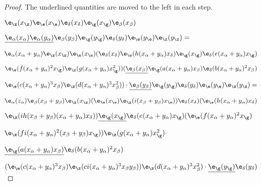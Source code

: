 \documentclass{memo-l}
\theoremstyle{definition}
\theoremstyle{remark}
\numberwithin{section}{chapter}
\numberwithin{equation}{chapter}
\begin{document}
\begin{proof}    The underlined quantities are moved to the left in each step.

${\e}_{{\z}}(x_{{\z}}){\e}_{{\e}}(x_{{\e}})
{\e}_{{\delta}}(x_{{\delta}}){\e}_{{\g}}(x_{{\g}})
{\e}_{\beta}(x_{\beta})$

$
{\underline{{\e}_{\alpha}(x_{\alpha}){\e}_{\alpha}(y_{\alpha})}}
{\e}_{\beta}(y_{\beta})
{\e}_{{\g}}(y_{{\g}}){\e}_{{\delta}}(y_{{\delta}})
{\e}_{{\e}}(y_{{\e}}){\e}_{{\z}}(y_{{\z}})=$

\medpagebreak

${\e}_{\alpha}({ {x_{\alpha}+y_{\alpha}}}){\e}_{{\z}}
(x_{{\z}}){\e}_{{\e}}(x_{{\e}})
{ (}{\e}_{{\delta}}(x_{{\delta}}){\e}_{{\e}}
(h(x_{\alpha}+y_{\alpha})x_{{\delta}}){\e}_{{\g}}
(x_{{\g}}){\e}_{{\delta}}(e(x_{\alpha}+y_{\alpha})x_\g)$

${\e}_{{\e}}(f(x_{\alpha}+y_{\alpha})^{2}x_{{\g}})
{\e}_{{\z}}(g(x_{\alpha}+y_{\alpha})x_{{\g}}^{2}))
({\underline{{\e}_{\beta}(x_{\beta})}}
{\e}_{{\g}}(a(x_{\alpha}
+y_{\alpha})x_{\beta}){\e}_{{\delta}}(b(x_{\alpha}+
y_{\alpha})^{2}x_{\beta})$

${\e}_{{\e}}(c(x_{\alpha}+y_{\alpha})^{3}x_{\beta})
{\e}_{{\z}}(d(x_{\alpha}+y_{\alpha})^{3}x_{\beta}^{2}))\cdot
{\underline{{\e}_{\beta}(y_{\beta})}} {\e}_{{\g}}
(y_{{\g}}){\e}_{{\delta}}(y_{{\delta}}){\e}_{{\e}}
(y_{{\e}}){\e}_{{\z}}(y_{{\z}}) =$

\medpagebreak

${\e}_{\alpha}(z_{\alpha}){\e}_{\beta}({ x_{\beta}+
y_{\beta}}){\e}_{{\z}}(x_{{\z}}){ (}{\e}_{{\e}}
(x_{{\e}}){\e}_{{\z}}(i(x_{\beta}+y_{\beta})x_{{\e}})
{ )}{\e}_{{\delta}}(x_{{\delta}}){ (}{\e}_{{\e}}
(h(x_{\alpha}+y_{\alpha})x_\delta)$

$\e_\z(ih(x_\beta+y_\beta)(x_\alpha+y_\alpha)
x_{{\delta}})){\underline{{\e}_{{\g}}(x_{{\g}})}}
{\e}_{{\delta}} (e(x_{\alpha}+y_{\alpha})x_{{\g}})
({\e}_{{\e}}(f(x_{\alpha}+y_{\alpha})^{2}x_{{\g}})$

${\e}_{{\z}}(fi(x_{\alpha}+y_{\alpha})^{2}(x_{\beta}+y_{\beta})
x_{{\g}}) { ) }{\e}_{{\z}}(g(x_{\alpha}+y_{\alpha})
x_{{\g}}^{2}) \cdot $

$
{\underline{{\e}_{{\g}}(a(x_{\alpha}+y_{\alpha})x_{\beta})}}
{\e}_{{\delta}}(b(x_{\alpha}+y_{\alpha})^{2}x_{\beta})$

$({\e}_{{\e}}(c(x_{\alpha}+y_{\alpha})^{3}x_{\beta})
{\e}_{{\z}}(ci(x_{\alpha}+y_{\alpha})^{3}x_{\beta}y_{\beta})
{ )}{\e}_{{\z}}(d(x_{\alpha}+y_{\alpha})^{3}x_{\beta}^{2})
\cdot {\underline{{\e}_{{\g}}(y_{{\g}})}}
{\e}_{{\delta}}(y_{{\delta}})$


\end{proof}
\end{document}
